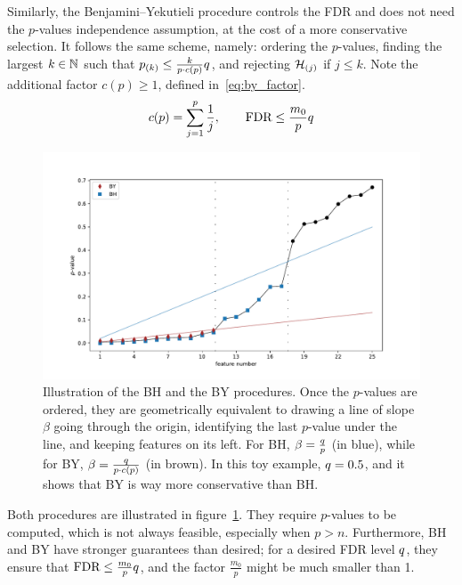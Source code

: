 Similarly, the Benjamini–Yekutieli procedure controls the FDR
and does not need the $p$-values independence assumption,
at the cost of a more conservative selection.
It follows the same scheme, namely:
ordering the $p$-values,
finding the largest $k \in \mathbb{N}$ such that $p_{(k)} \leq \frac{k}{p \cdot c(p)}q$,
and rejecting $\mathcal{H}_{(j)}$ if $j \leq k$.
Note the additional factor $c(p) \geq 1$, defined in~\ref{eq:by_factor}.
\begin{equation}\label{eq:by_factor}
c(p) = \sum_{j = 1}^p \frac{1}{j}
,\qquad
\text{FDR} \leq \frac{m_0}{p}q
\end{equation}
\begin{figure}[h]
    \centering
    \includegraphics[width=1.\textwidth]{figures/bhy.pdf}
    \caption{
        Illustration of the BH and the BY procedures.
        Once the $p$-values are ordered,
        they are geometrically equivalent to drawing a line of slope $\beta$ going through the origin,
        identifying the last $p$-value under the line, and keeping features on its left.
        For BH, $\beta = \frac{q}{p}$ (in blue),
        while for BY, $\beta = \frac{q}{p \cdot c(p)}$ (in brown).
        In this toy example, $q = 0.5$, and it shows that BY is way more conservative than BH.
    }
    \label{fig:bhy}
\end{figure}
\bigbreak
Both procedures are illustrated in figure~\ref{fig:bhy}.
They require $p$-values to be computed, which is not always feasible, especially when $p > n$.
Furthermore, BH and BY have stronger guarantees than desired;
for a desired FDR level $q$,
they ensure that $\text{FDR} \leq \frac{m_0}{p}q$,
and the factor $\frac{m_0}{p}$ might be much smaller than 1.

